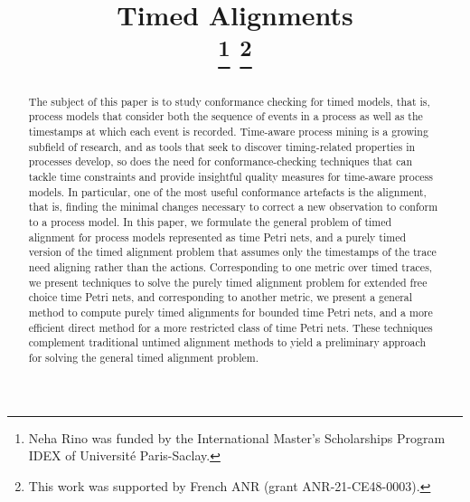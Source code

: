 \documentclass[conference]{IEEEtran}
\begin{document}
	\title{Timed Alignments\\
		\thanks{Neha Rino was funded by the International Master's Scholarships Program IDEX of Université Paris-Saclay.}
                \thanks{This work was supported by French ANR (grant ANR-21-CE48-0003).}
	}
	
	\author{
		
		\and
	}
	
	
	\maketitle
	
	\begin{abstract}
		The subject of this paper is to study conformance checking for timed models, that is, process models that consider both the sequence of events in a process as well as the timestamps at which each event is recorded. 
        Time-aware process mining is a growing subfield of research, and as tools that seek to discover timing-related properties in processes develop, so does the need for conformance-checking techniques that can tackle time constraints and provide insightful quality measures for time-aware process models. 
        In particular, one of the most useful conformance artefacts is the alignment, that is, finding the minimal changes necessary to correct a new observation to conform to a process model.  
        In this paper, we formulate the general problem of timed alignment for process models represented as time Petri nets, and a purely timed version of the timed alignment problem that assumes only the timestamps of the trace need aligning rather than the actions. 
		Corresponding to one metric over timed traces, we present techniques to solve the purely timed alignment problem for extended free choice time Petri nets, and corresponding to another metric, we present a general method to compute purely timed alignments for bounded time Petri nets, and a more efficient direct method for a more restricted class of time Petri nets. 
		These techniques complement traditional untimed alignment methods to yield a preliminary approach for solving the general timed alignment problem. 
    \end{abstract}
	
\end{document}
